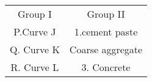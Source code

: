 

\begin{table}[h]
\centering
\begin{tabular}{c @{\hskip 1 cm} c}
Group I & Group II \\
P.Curve J & 1.cement paste \\
Q. Curve K & Coarse aggregate \\ 
R. Curve L & 3. Concrete \\

\end{tabular}
\end{table}

